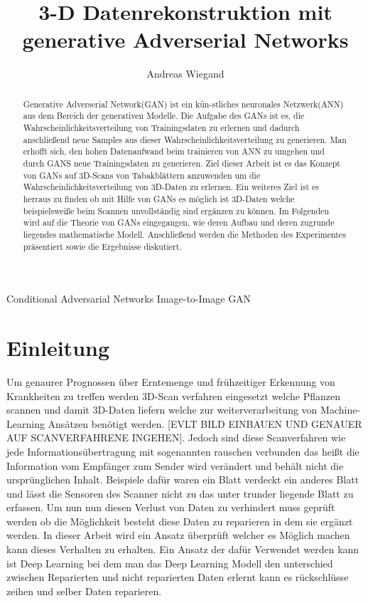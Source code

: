 \documentclass{llncs}
\begin{document}
\tableofcontents
\begin{acronym}[Bash]
	Conditional Adversarial Networks
	 Image-to-Image GAN
\end{acronym}
\title{3-D Datenrekonstruktion mit generative Adverserial Networks}
\author{Andreas Wiegand}
\maketitle								%
%
\begin{abstract}		
Generative Adverserial Network(GAN) ist ein kün-stliches neuronales Netzwerk(ANN) aus dem Bereich der generativen Modelle. Die Aufgabe des GANs ist es, die Wahrscheinlichkeitsverteilung von Trainingsdaten zu erlernen und dadurch anschließend neue Samples aus dieser Wahrscheinlichkeitsverteilung zu generieren. Man erhofft sich, den hohen Datenaufwand beim trainieren von ANN zu umgehen und durch GANS neue Trainingsdaten zu generieren. Ziel dieser Arbeit ist es das Konzept von GANs auf 3D-Scans von Tabakblättern anzuwenden um die Wahrscheinlichkeitsverteilung von 3D-Daten zu erlernen. Ein weiteres Ziel ist es herraus zu finden ob mit Hilfe von GANs es möglich ist 3D-Daten welche beispielsweiße beim Scannen unvollständig sind ergänzen zu können. Im Folgenden wird auf die Theorie von GANs eingegangen, wie deren Aufbau und deren zugrunde liegendes mathematische Modell. Anschließend werden die Methoden des Experimentes präsentiert sowie die Ergebnisse diskutiert.  
\end{abstract}
%
\section{Einleitung}%

Um genaurer Prognossen über Erntemenge und frühzeitiger Erkennung von Krankheiten zu treffen werden 3D-Scan verfahren eingesetzt welche Pflanzen scannen und damit 3D-Daten liefern welche zur weiterverarbeitung von Machine-Learning Ansätzen benötigt werden. [EVLT BILD EINBAUEN UND GENAUER AUF SCANVERFAHRENE INGEHEN]. Jedoch sind diese Scanverfahren wie jede Informationsübertragung mit sogenannten rauschen verbunden das heißt die Information vom Empfänger zum Sender wird verändert und behält nicht die ursprünglichen Inhalt. Beispiele dafür waren ein Blatt verdeckt ein anderes Blatt und lässt die Sensoren des Scanner nicht zu das unter trunder liegende Blatt zu erfassen. Um nun nun diesen Verlust von Daten zu verhindert muss geprüft werden ob die Möglichkeit besteht diese Daten zu reparieren in dem sie ergänzt werden. In dieser Arbeit wird ein Ansatz überprüft welcher es Möglich machen kann dieses Verhalten zu erhalten.  Ein Ansatz der dafür Verwendet werden kann ist Deep Learning bei dem man das Deep Learning Modell den unterschied zwischen Reparierten und nicht reparierten Daten erlernt kann es rückschlüsse zeihen und selber Daten reparieren.
\\
\end{document}
